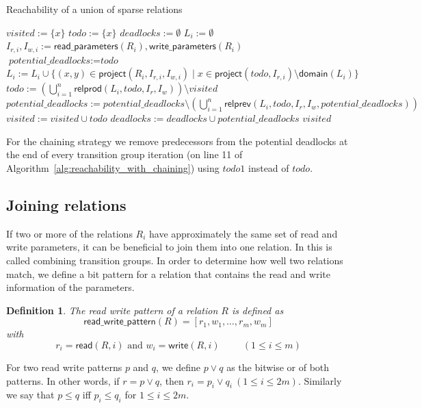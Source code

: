 \documentclass{article}
\newtheorem{definition}[theorem]{Definition}
\newcommand{\var}[1]{\ensuremath{\textit{#1}}}
\begin{document}
\begin{algorithm}[h]
\caption{Reachability of a union of sparse relations}
\label{alg:reachability_with_deadlock}
\begin{algorithmic}[1]
\State $\var{visited} := \{ x \}$
\State $\var{todo} := \{ x \}$
\State $\var{deadlocks} := \emptyset$
    \State $L_i := \emptyset$
    \State $I_{r,i}, I_{w,i} := \textsf{read\_parameters}(R_i), \textsf{write\_parameters}(R_i)$
\EndFor
\While {$\var{todo} \neq \emptyset$}
    \State $\var{potential\_deadlocks} := \var{todo}$
        \State $L_i := L_i \cup \{ (x,y) \in \textsf{project}(R_i, I_{r,i}, I_{w,i}) \mid x \in \textsf{project}(\var{todo}, I_{r,i})  \setminus \textsf{domain}(L_i) \}$
    \EndFor
    \State $\var{todo} := \left( \bigcup\limits_{i=1}^n \textsf{relprod}(L_i, \var{todo}, I_r, I_w) \right) \setminus \var{visited}$
    \State $\var{potential\_deadlocks} := \var{potential\_deadlocks} \setminus \left( \bigcup\limits_{i=1}^n \textsf{relprev}(L_i, \var{todo}, I_r, I_w, \var{potential\_deadlocks}) \right)$
    \State $\var{visited} := \var{visited} \cup \var{todo}$
    \State $\var{deadlocks} := \var{deadlocks} \cup \var{potential\_deadlocks}$
\EndWhile
\State \Return \var{visited}
\EndFunction
\end{algorithmic}
\end{algorithm}
For the chaining strategy we remove predecessors from the potential deadlocks at the end of every transition group iteration (on line 11 of Algorithm~\ref{alg:reachability_with_chaining}) using $\var{todo1}$ instead of $\var{todo}$.

\subsection{Joining relations}
If two or more of the relations $R_i$ have approximately the same set of read and write parameters, it can be beneficial to join them into one relation. In \cite{Meijer2019} this is called combining transition groups. 
In order to
determine how well two relations match, we define a bit pattern for a relation that contains the read and write information of the parameters.

\begin{definition}
The read write pattern of a relation $R$ is defined as
\[
\textsf{read\_write\_pattern}(R) = [r_1, w_1, \ldots, r_m, w_m]
\]
with
\[
  r_i = \textsf{read}(R, i) \text{ and } w_i = \textsf{write}(R, i) \hspace{1cm} (1 \leq i \leq m)
\]
\end{definition}
For two read write patterns $p$ and $q$, we define $p \lor q$ as the bitwise or of both patterns. In other words, if $r = p \lor q$, then $r_i = p_i \lor q_i ~ (1 \leq i \leq 2m)$. Similarly we say that $p \leq q$ iff $p_i \leq q_i$ for $1 \leq i \leq 2m$.
\end{document}
